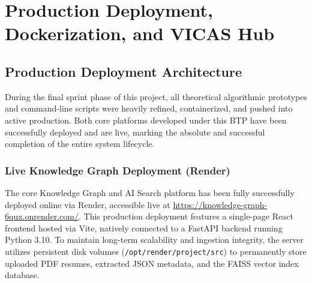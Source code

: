 \documentclass[12pt,a4paper]{report}
\begin{document}
\chapter{Production Deployment, Dockerization, and VICAS Hub}

\section{Production Deployment Architecture}

During the final sprint phase of this project, all theoretical algorithmic prototypes and command-line scripts were heavily refined, containerized, and pushed into active production. Both core platforms developed under this BTP have been successfully deployed and are live, marking the absolute and successful completion of the entire system lifecycle.

\subsection{Live Knowledge Graph Deployment (Render)}
The core Knowledge Graph and AI Search platform has been fully successfully deployed online via Render, accessible live at \url{https://knowledge-graph-6qux.onrender.com/}. This production deployment features a single-page React frontend hosted via Vite, natively connected to a FastAPI backend running Python 3.10. To maintain long-term scalability and ingestion integrity, the server utilizes persistent disk volumes (\texttt{/opt/render/project/src}) to permanently store uploaded PDF resumes, extracted JSON metadata, and the FAISS vector index database.
\end{document}
